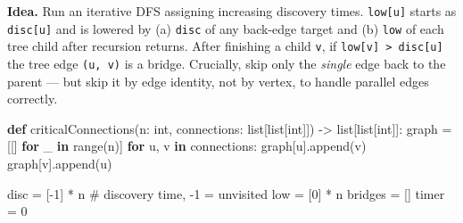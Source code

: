 \documentclass[11pt]{article}
\newenvironment{Shaded}{\begin{snugshade}}{\end{snugshade}}
\newcommand{\BuiltInTok}[1]{\textcolor[rgb]{0.50,0.55,0.55}{#1}}
\newcommand{\CommentTok}[1]{\textcolor[rgb]{0.48,0.49,0.49}{#1}}
\newcommand{\ControlFlowTok}[1]{\textcolor[rgb]{0.99,0.74,0.29}{\textbf{#1}}}
\newcommand{\DecValTok}[1]{\textcolor[rgb]{0.96,0.45,0.00}{#1}}
\newcommand{\KeywordTok}[1]{\textcolor[rgb]{0.81,0.81,0.76}{\textbf{#1}}}
\newcommand{\NormalTok}[1]{\textcolor[rgb]{0.81,0.81,0.76}{#1}}
\newcommand{\OperatorTok}[1]{\textcolor[rgb]{0.81,0.81,0.76}{#1}}
\begin{document}
\textbf{Idea.} Run an iterative DFS assigning increasing discovery times. \texttt{low{[}u{]}} starts as \texttt{disc{[}u{]}} and is lowered by (a) \texttt{disc} of any back-edge target and (b) \texttt{low} of each tree child after recursion returns. After finishing a child \texttt{v}, if \texttt{low{[}v{]}\ \textgreater{}\ disc{[}u{]}} the tree edge \texttt{(u,\ v)} is a bridge. Crucially, skip only the \emph{single} edge back to the parent --- but skip it by edge identity, not by vertex, to handle parallel edges correctly.


\begin{Shaded}
\begin{Highlighting}[]
\KeywordTok{def}\NormalTok{ criticalConnections(n: }\BuiltInTok{int}\NormalTok{, connections: }\BuiltInTok{list}\NormalTok{[}\BuiltInTok{list}\NormalTok{[}\BuiltInTok{int}\NormalTok{]]) }\OperatorTok{{-}\textgreater{}} \BuiltInTok{list}\NormalTok{[}\BuiltInTok{list}\NormalTok{[}\BuiltInTok{int}\NormalTok{]]:}
\NormalTok{    graph }\OperatorTok{=}\NormalTok{ [[] }\ControlFlowTok{for}\NormalTok{ \_ }\KeywordTok{in} \BuiltInTok{range}\NormalTok{(n)]}
    \ControlFlowTok{for}\NormalTok{ u, v }\KeywordTok{in}\NormalTok{ connections:}
\NormalTok{        graph[u].append(v)}
\NormalTok{        graph[v].append(u)}

\NormalTok{    disc }\OperatorTok{=}\NormalTok{ [}\OperatorTok{{-}}\DecValTok{1}\NormalTok{] }\OperatorTok{*}\NormalTok{ n          }\CommentTok{\# discovery time, {-}1 = unvisited}
\NormalTok{    low }\OperatorTok{=}\NormalTok{ [}\DecValTok{0}\NormalTok{] }\OperatorTok{*}\NormalTok{ n}
\NormalTok{    bridges }\OperatorTok{=}\NormalTok{ []}
\NormalTok{    timer }\OperatorTok{=} \DecValTok{0}


\end{Highlighting}
\end{Shaded}
\end{document}
